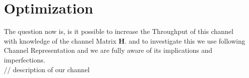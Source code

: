 ﻿\chapter{Optimization}

The question now is, is it possible to increase the Throughput of this channel with knowledge of the channel Matrix $\mathbf{H}$. and to investigate this we use following Channel Representation and we are fully aware of its implications and imperfections.
\\// description of our channel





